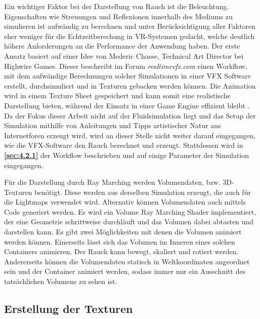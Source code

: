Ein wichtiger Faktor bei der Darstellung von Rauch ist die Beleuchtung. Eigenschaften wie Streuungen und Reflexionen innerhalb des Mediums zu simulieren ist
aufwändig zu berechnen und unter Berücksichtigung aller Faktoren eher weniger für die Echtzeitberechung in VR-Systemen gedacht, welche deutlich höhere Anforderungen an die Performance der Anwendung
haben. Der erste Ansatz basiert auf einer Idee von Mederic Chasse, Technical Art Director  bei Highwire Games.
Dieser beschreibt im Forum \textit{realtimevfx.com} einen Workflow, mit dem aufwändige Berechnungen solcher Simulationen in einer VFX Software erstellt, durchsimuliert und in Texturen gebacken
werden können.
Die Animation wird in einem Texture Sheet gespeichert und kann somit eine realistische Darstellung bieten, während der Einsatz in einer Game Engine effizient bleibt \parencite{Chasse2018}.
Da der Fokus dieser Arbeit nicht auf der Fluidsimulation liegt und das Setup der Simulation mithilfe von Anleitungen
und Tipps artistischer Natur aus Internetforen erzeugt wird, wird an dieser Stelle nicht weiter darauf eingegangen, wie die VFX-Software den Rauch berechnet und erzeugt.
Stattdessen wird in \textbf{\autoref{sec:4.2.1}} der Workflow beschrieben und auf einige Parameter der Simulation eingegangen.

Für die Darstellung durch Ray Marching werden Volumendaten, bzw. 3D-Texturen benötigt. Diese werden aus derselben Simulation erzeugt, die auch für die Lightmaps verwendet wird.
Alternativ können Volumendaten auch mittels Code generiert werden.
Es wird ein Volume Ray Marching Shader implementiert, der eine Geometrie schrittweise durchläuft und das Volumen dabei abtasten und darstellen kann.
Es gibt zwei Möglichkeiten mit denen die Volumen animiert werden können. Einerseits lässt sich das Volumen im Inneren eines solchen Containers animieren.
Der Rauch kann bewegt, skaliert und rotiert werden. Andererseits können die Volumendaten statisch in Weltkoordinaten angeordnet sein und der Container
animiert werden, sodass immer nur ein Ausschnitt des tatsächlichen Volumens zu sehen ist.


\subsection{Erstellung der Texturen}
\label{sec:4.2}


